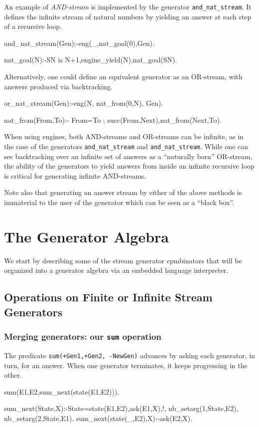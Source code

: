\documentclass{new_tlp}
\begin{document}
An example of {\em AND-stream} is  implemented
by the generator {\tt and\_nat\_stream}. 
It defines the infinite stream of natural numbers 
by yielding an answer at each step of a recursive loop.
\begin{code}
and_nat_stream(Gen):-eng(_,nat_goal(0),Gen).

nat_goal(N):-SN is N+1,engine_yield(N),nat_goal(SN).
\end{code}

Alternatively, one could define 
an equivalent generator as an OR-stream,  with answers 
produced via  backtracking.
\begin{code}
or_nat_stream(Gen):-eng(N, nat_from(0,N), Gen).

nat_from(From,To):- From=To ; succ(From,Next),nat_from(Next,To).
\end{code}

When using engines, 
both AND-streams and OR-streams can be infinite, as in the
case of the generators {\tt and\_nat\_stream} and {\tt and\_nat\_stream}.
While one can see backtracking over an infinite set of answers as
a ``naturally born'' OR-stream, the ability of the generators to
yield answers from inside an infinite recursive loop is critical
for generating infinite AND-streams.

Note also that generating an answer stream by either of the above methods
is immaterial to the user of the generator which can be seen as a ``black box''.



\section{The Generator Algebra}
We start by describing some of the stream generator cpmbinators
that will be organized into a generator algebra 
via an embedded language interpreter.
 
\subsection{Operations on Finite or  Infinite Stream Generators}

\subsubsection{Merging generators: our {\tt sum} operation}

The predicate {\tt sum(+Gen1,+Gen2, -NewGen)} advances by asking each generator, in turn, for an answer. When one generator terminates, it keeps progressing in the other.
\begin{code}
sum(E1,E2,sum_next(state(E1,E2))).

sum_next(State,X):-State=state(E1,E2),ask(E1,X),!,
  nb_setarg(1,State,E2),
  nb_setarg(2,State,E1).
sum_next(state(_,E2),X):-ask(E2,X).
\end{code}
\end{document}
